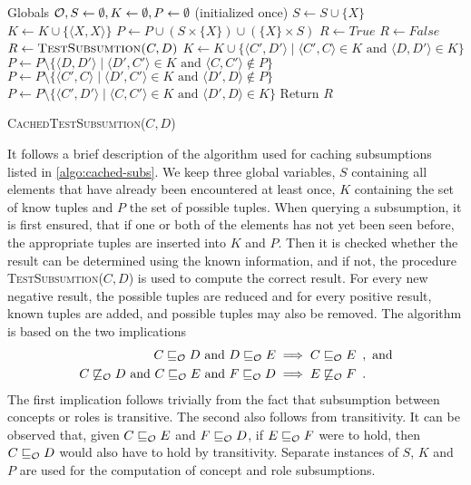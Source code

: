 \begin{algorithm}[ht]
  \begin{algorithmic}
    \State Globals $\mathcal{O}, S \gets \emptyset, K \gets \emptyset, P \gets \emptyset$ \quad (initialized once)
      \State $S \gets S \cup \{ X \}$
      \State $K \gets K \cup \{ \langle X, X \rangle \}$
      \State $P \gets P \cup ( S \times \{ X \} ) \cup ( \{ X \} \times S )$
    \EndFor
      \State $R \gets \mathit{True}$
      \State $R \gets \mathit{False}$
    \Else
      \State $R \gets \textsc{TestSubsumtion($C, D$)}$
        \State $K \gets K \cup \{ \langle C', D' \rangle \mid \langle C', C \rangle \in K \text{ and } \langle D, D' \rangle \in K \}$
        \State $P \gets P \setminus \{ \langle D, D' \rangle \mid \langle D', C' \rangle \in K \text{ and } \langle C, C' \rangle \not\in P \}$
        \State $P \gets P \setminus \{ \langle C', C \rangle \mid \langle D', C' \rangle \in K \text{ and } \langle D', D \rangle \not\in P \}$
      \Else
        \State $P \gets P \setminus \{ \langle C', D' \rangle \mid \langle C, C' \rangle \in K \text{ and } \langle D', D \rangle \in K \}$
      \EndIf
    \EndIf
    \State Return $R$
  \end{algorithmic}
  \caption{\textsc{CachedTestSubsumtion}($C, D$)}
  \label{algo:cached-subs}
\end{algorithm}

It follows a brief description of the algorithm used for caching subsumptions listed in \cref{algo:cached-subs}. We keep three global variables, $S$ containing all elements that have already been encountered at least once, $K$ containing the set of know tuples and $P$ the set of possible tuples. When querying a subsumption, it is first ensured, that if one or both of the elements has not yet been seen before, the appropriate tuples are inserted into $K$ and $P$. Then it is checked whether the result can be determined using the known information, and if not, the procedure \textsc{TestSubsumtion($C, D$)} is used to compute the correct result. For every new negative result, the possible tuples are reduced and for every positive result, known tuples are added, and possible tuples may also be removed. The algorithm is based on the two implications
\begin{align*}
  C \sqsubseteq_\mathcal{O} D \text{ and } D \sqsubseteq_\mathcal{O} E &\implies C \sqsubseteq_\mathcal{O} E \enspace,\text{ and} \\
  C \not\sqsubseteq_\mathcal{O} D \text{ and } C \sqsubseteq_\mathcal{O} E \text{ and } F \sqsubseteq_\mathcal{O} D &\implies E \not\sqsubseteq_\mathcal{O} F \enspace.
\end{align*}
The first implication follows trivially from the fact that subsumption between concepts or roles is transitive. The second also follows from transitivity. It can be observed that, given $C \sqsubseteq_\mathcal{O} E$ and $F \sqsubseteq_\mathcal{O} D$, if $E \sqsubseteq_\mathcal{O} F$ were to hold, then $C \sqsubseteq_\mathcal{O} D$ would also have to hold by transitivity. Separate instances of $S$, $K$ and $P$ are used for the computation of concept and role subsumptions.

